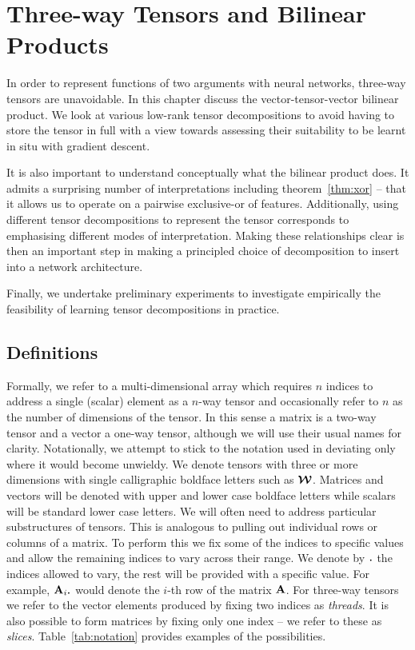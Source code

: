 
\chapter{Three-way Tensors and Bilinear Products}\label{C:tens}

In order to represent functions of two arguments with neural networks, three-way tensors are 
unavoidable. In this chapter discuss the vector-tensor-vector bilinear product. We look at various
low-rank tensor decompositions to avoid having to store the tensor in full with a view towards
assessing their suitability to be learnt in situ with gradient descent.

It is also important to understand conceptually what the bilinear product does. It admits a surprising
number of interpretations including theorem~\ref{thm:xor} -- that it allows us to operate on a
pairwise exclusive-or of features. Additionally, using different tensor decompositions to represent
the tensor corresponds to emphasising different modes of interpretation. Making these relationships
clear is then an important step in making a principled choice of decomposition to insert into a 
network architecture.

Finally, we undertake preliminary experiments to investigate empirically the feasibility of learning
tensor decompositions in practice.

\section{Definitions}
Formally, we refer to a multi-dimensional array which requires \(n\) indices to address a single
(scalar) element as a \(n\)-way tensor and occasionally refer to \(n\) as the number of dimensions of
the tensor. In this sense a matrix is a two-way tensor and a vector
a one-way tensor, although we will use their usual names for clarity. Notationally, we attempt to
stick to the notation used in \autocite{Kolda2009} deviating only where it would become unwieldy.
We denote tensors with three or more dimensions with single calligraphic boldface letters such
as \(\bm{\mathcal{W}}\). Matrices and vectors will be denoted with upper and lower case boldface letters
while scalars will be standard lower case letters. We will often need to address particular
substructures of tensors. This is analogous to pulling out individual rows or columns of a matrix.
To perform this we fix some of the indices to specific values and allow the remaining indices to vary
across their range. We denote by \(\midbullet\) the indices allowed to vary, the rest will be provided
with a specific value. For example, \(\mat{A}_{i \midbullet}\) would denote the \(i\)-th row of the
matrix \(\mathbf{A}\).
For three-way tensors we refer to the vector elements produced by fixing two indices as 
\emph{threads}. It is also possible to form matrices by fixing only one index -- we refer to these
as \emph{slices}. Table~\ref{tab:notation} provides examples of the possibilities.

